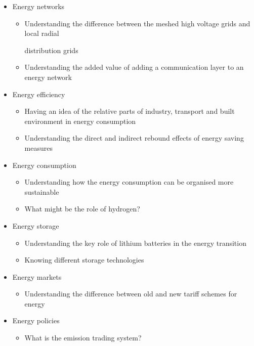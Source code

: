 \documentclass[../summary.tex]{subfiles}
\begin{document}
\begin{itemize}
	\item Energy networks
	      \begin{itemize}
		      \item Understanding the difference between the meshed high voltage grids and local radial

		            distribution grids
		      \item Understanding the added value of adding a communication layer to an energy network
	      \end{itemize}

	\item Energy efficiency
	      \begin{itemize}
		      \item Having an idea of the relative parts of industry, transport and built environment in energy consumption
		      \item Understanding the direct and indirect rebound effects of energy saving measures
	      \end{itemize}

	\item Energy consumption
	      \begin{itemize}
		      \item Understanding how the energy consumption can be organised more sustainable
		      \item What might be the role of hydrogen?
	      \end{itemize}

	\item Energy storage
	      \begin{itemize}
		      \item Understanding the key role of lithium batteries in the energy transition
		      \item Knowing different storage technologies
	      \end{itemize}

	\item Energy markets
	      \begin{itemize}
		      \item Understanding the difference between old and new tariff schemes for energy
	      \end{itemize}

	\item Energy policies
	      \begin{itemize}
		      \item What is the emission trading system?
	      \end{itemize}
\end{itemize}
\newpage
\end{document}
